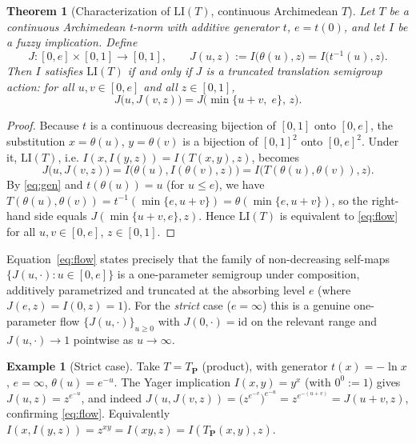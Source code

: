 \documentclass{amsart}
\newtheorem{theorem}{Theorem}
\theoremstyle{definition}
\newtheorem{example}{Example}
\theoremstyle{remark}
\newcommand{\zo}{[0,1]}
\newcommand{\LI}{\mathrm{LI}}
\begin{document}
\begin{theorem}[Characterization of $\LI(T)$, continuous Archimedean $T$]\label{thm:a-arch}
Let $T$ be a continuous Archimedean t-norm with additive generator $t$, $e=t(0)$, and let
$I$ be a fuzzy implication. Define
\begin{equation}\label{eq:J}
J\colon[0,e]\times\zo\to\zo,\qquad J(u,z):=I\bigl(\theta(u),z\bigr)=I\bigl(t^{-1}(u),z\bigr).
\end{equation}
Then $I$ satisfies $\LI(T)$ if and only if $J$ is a \emph{truncated translation
semigroup action}: for all $u,v\in[0,e]$ and all $z\in\zo$,
\begin{equation}\label{eq:flow}
J\bigl(u,J(v,z)\bigr)=J\bigl(\min\{u+v,\;e\},\,z\bigr).
\end{equation}
\end{theorem}

\begin{proof}
Because $t$ is a continuous decreasing bijection of $\zo$ onto $[0,e]$, the substitution
$x=\theta(u)$, $y=\theta(v)$ is a bijection of $\zo^2$ onto $[0,e]^2$. Under it,
$\LI(T)$, i.e. $I(x,I(y,z))=I(T(x,y),z)$, becomes
\[
J\bigl(u,J(v,z)\bigr)=I\bigl(\theta(u),I(\theta(v),z)\bigr)
=I\bigl(T(\theta(u),\theta(v)),z\bigr).
\]
By \eqref{eq:gen} and $t(\theta(u))=u$ (for $u\le e$), we have
$T(\theta(u),\theta(v))=t^{-1}(\min\{e,u+v\})=\theta(\min\{e,u+v\})$, so the right-hand
side equals $J(\min\{u+v,e\},z)$. Hence $\LI(T)$ is equivalent to \eqref{eq:flow} for all
$u,v\in[0,e]$, $z\in\zo$.
\end{proof}

Equation~\eqref{eq:flow} states precisely that the family of non-decreasing self-maps
$\{J(u,\cdot):u\in[0,e]\}$ is a one-parameter semigroup under composition, additively
parametrized and truncated at the absorbing level $e$ (where $J(e,z)=I(0,z)=1$). For the
\emph{strict} case ($e=\infty$) this is a genuine one-parameter flow
$\{J(u,\cdot)\}_{u\ge0}$ with $J(0,\cdot)=\mathrm{id}$ on the relevant range and
$J(u,\cdot)\to 1$ pointwise as $u\to\infty$.

\begin{example}[Strict case]\label{ex:strict}
Take $T=T_{\mathbf P}$ (product), with generator $t(x)=-\ln x$, $e=\infty$,
$\theta(u)=e^{-u}$. The Yager implication $I(x,y)=y^{x}$ (with $0^0:=1$) gives
$J(u,z)=z^{e^{-u}}$, and indeed
$J(u,J(v,z))=\bigl(z^{e^{-v}}\bigr)^{e^{-u}}=z^{e^{-(u+v)}}=J(u+v,z)$, confirming
\eqref{eq:flow}. Equivalently $I(x,I(y,z))=z^{xy}=I(xy,z)=I(T_{\mathbf P}(x,y),z)$.
\end{example}
\end{document}
